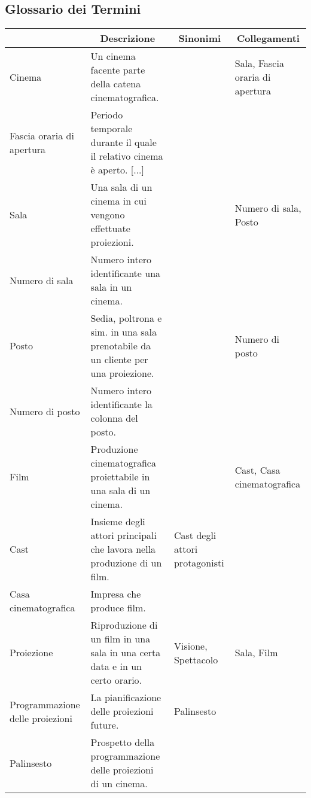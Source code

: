 \subsection*{Glossario dei Termini}
%
%
\begin{longtable}{|p{3.86cm}|p{3.86cm}|p{3.86cm}|p{3.86cm}|}
    \hline
    \rowcolor{tblhdrcolor}
    \multicolumn{1}{|c|}{\textbf{Termine}}
     & \multicolumn{1}{|c|}{\textbf{Descrizione}}
     & \multicolumn{1}{|c|}{\textbf{Sinonimi}}
     & \multicolumn{1}{|c|}{\textbf{Collegamenti}}
    \\\hline
    Cinema
     & Un cinema facente parte della catena cinematografica.
     &
     & Sala, Fascia oraria di apertura
    \\\hline
    Fascia oraria di apertura
     & Periodo temporale durante il quale il relativo cinema è aperto. [...]
     &
     &
    \\ \hline
    Sala
     & Una sala di un cinema in cui vengono effettuate proiezioni.
     &
     & Numero di sala, Posto
    \\\hline
    Numero di sala
     & Numero intero identificante una sala in un cinema.
     &
     &
    \\\hline
    Posto
     & Sedia, poltrona e sim. in una sala prenotabile da un cliente
    per una proiezione.
     &
     & Numero di posto
    \\\hline
    Numero di posto
     & Numero intero identificante la colonna del posto.
     &
     &
    \\\hline
    Film
     & Produzione cinematografica proiettabile in una sala di un cinema.
     &
     & Cast, Casa cinematografica
    \\\hline
    Cast
     & Insieme degli attori principali che lavora nella produzione di un film.
     & Cast degli attori protagonisti
     &
    \\\hline
    Casa cinematografica
     & Impresa che produce film.
     &
     &
    \\ \hline
    Proiezione
     & Riproduzione di un film in una sala in una certa data e in un
    certo orario.
     & Visione, Spettacolo
     & Sala, Film
    \\ \hline
    Programmazione delle proiezioni
     & La pianificazione delle proiezioni future.
     & Palinsesto
     &
    \\ \hline
    Palinsesto
     & Prospetto della programmazione delle proiezioni di un cinema.

\end{longtable}
